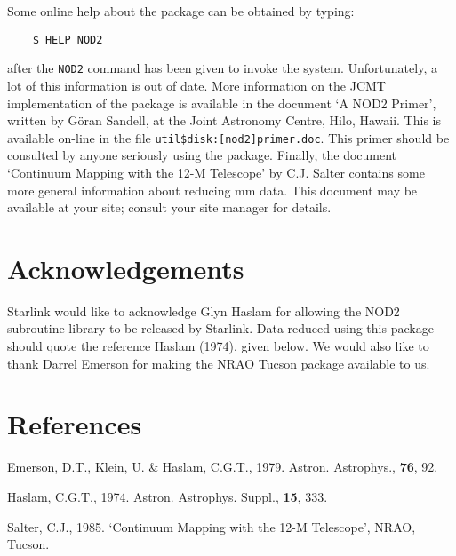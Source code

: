 Some online help about the package can be obtained by typing:
\begin{verbatim}
    $ HELP NOD2
\end{verbatim}
after the {\tt NOD2} command has been given to invoke the system.
Unfortunately, a lot of this information is out of date. More
information on the JCMT implementation of the package is available
in the document `A NOD2 Primer', written by G\"{o}ran Sandell, at
the Joint Astronomy Centre, Hilo, Hawaii. This is available on-line
in the file {\tt util\$disk:[nod2]primer.doc}. This primer should
be consulted by anyone seriously using the package. Finally, the
document `Continuum Mapping with the 12-M Telescope' by C.J. Salter
contains some more general information about reducing mm data.
This document may be available at your site; consult your site manager
for details.

\section {Acknowledgements}

Starlink would like to acknowledge Glyn Haslam for allowing the NOD2
subroutine library to be released by Starlink. Data reduced using this
package should quote the reference Haslam (1974), given below. We
would also like to thank Darrel Emerson for making the NRAO Tucson
package available to us.

\section {References}

Emerson, D.T., Klein, U. \& Haslam, C.G.T., 1979. Astron. Astrophys.,
{\bf 76}, 92.

Haslam, C.G.T., 1974. Astron. Astrophys. Suppl., {\bf 15}, 333.

Salter, C.J., 1985. `Continuum Mapping with the 12-M Telescope',
NRAO, Tucson.


             
                                                        
